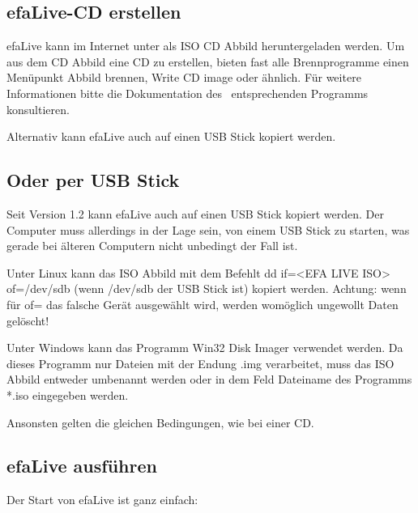 \documentclass[a4paper,12pt,twoside]{article}
\newcounter{Abb}
\begin{document}
\bigskip

\subsection[efaLive{}-CD erstellen]{efaLive{}-CD erstellen}
efaLive kann im Internet unter \cite{EFA4} als ISO CD Abbild
heruntergeladen werden. Um aus dem CD Abbild eine CD zu erstellen,
bieten fast alle Brennprogramme einen Menüpunkt {\textquotedbl}Abbild
brennen{\textquotedbl}, {\textquotedbl}Write CD image{\textquotedbl}
oder ähnlich. Für weitere Informationen bitte die Dokumentation des
\ entsprechenden Programms konsultieren. 

Alternativ kann efaLive auch auf einen USB Stick kopiert werden.

\subsection[Oder per USB Stick]{Oder per USB Stick}
Seit Version 1.2 kann efaLive auch auf einen USB Stick kopiert werden.
Der Computer muss allerdings in der Lage sein, von einem USB Stick zu
starten, was gerade bei älteren Computern nicht unbedingt der Fall ist.


\bigskip

Unter Linux kann das ISO Abbild mit dem Befehlt {\textquotedbl}dd
if={\textless}EFA LIVE ISO{\textgreater} of=/dev/sdb{\textquotedbl}
(wenn /dev/sdb der USB Stick ist) kopiert werden. Achtung: wenn für of=
das falsche Gerät ausgewählt wird, werden womöglich ungewollt Daten
gelöscht!


\bigskip

Unter Windows kann das Programm Win32 Disk Imager \cite{IMG1} verwendet
werden. Da dieses Programm nur Dateien mit der Endung
{\textquotedbl}.img{\textquotedbl} verarbeitet, muss das ISO Abbild
entweder umbenannt werden oder in dem Feld
{\textquotedbl}Dateiname{\textquotedbl} des Programms
{\textquotedbl}*.iso{\textquotedbl} eingegeben werden.


\bigskip

Ansonsten gelten die gleichen Bedingungen, wie bei einer CD.


\bigskip

\subsection[efaLive ausführen]{efaLive ausführen}
Der Start von efaLive ist ganz einfach:


\bigskip
\end{document}
